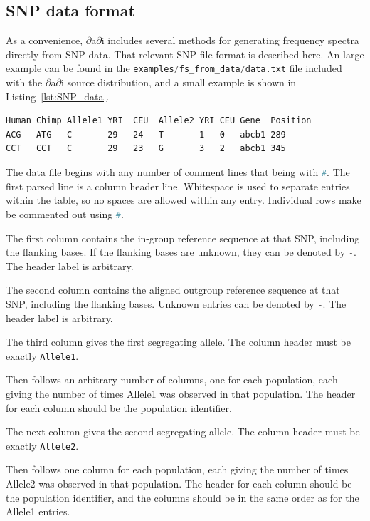 \documentclass[12pt]{article}
\makeatletter
\newcommand{\dadi}{$\partial$a$\partial$i\xspace}
\newcommand{\py}[1]{\lstinline[language=Python, showstringspaces=False]@#1@}
\makeatother
\begin{document}
\subsection{SNP data format}

As a convenience, \dadi includes several methods for generating frequency spectra directly from SNP data.
That relevant SNP file format is described here.
An large example can be found in the \py{examples/fs_from_data/data.txt} file included with the \dadi source distribution, and a small example is shown in Listing~\ref{lst:SNP_data}.

\begin{lstlisting}[caption={Example of SNP file format}, float, label={lst:SNP_data}]
Human Chimp Allele1 YRI  CEU  Allele2 YRI CEU Gene  Position
ACG   ATG   C       29   24   T       1   0   abcb1 289
CCT   CCT   C       29   23   G       3   2   abcb1 345
\end{lstlisting}

The data file begins with any number of comment lines that being with \py{#}.
The first parsed line is a column header line.
Whitespace is used to separate entries within the table, so no spaces are allowed within any entry.
Individual rows make be commented out using \py{#}.

The first column contains the in-group reference sequence at that SNP, including the flanking bases.
If the flanking bases are unknown, they can be denoted by \py{-}.
The header label is arbitrary.

The second column contains the aligned outgroup reference sequence at that SNP, including the flanking bases.
Unknown entries can be denoted by \py{-}.
The header label is arbitrary.

The third column gives the first segregating allele.
The column header must be exactly \py{Allele1}.

Then follows an arbitrary number of columns, one for each population, each giving the number of times Allele1 was observed in that population.
The header for each column should be the population identifier.

The next column gives the second segregating allele.
The column header must be exactly \py{Allele2}.

Then follows one column for each population, each giving the number of times Allele2 was observed in that population.
The header for each column should be the population identifier, and the columns should be in the same order as for the Allele1 entries.
\end{document}
